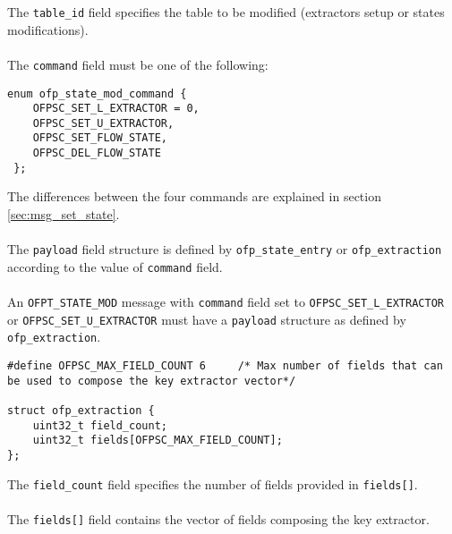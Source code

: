 \noindent
The \texttt{table\_id} field specifies the table to be modified (extractors setup or states modifications).
\\\\
The \texttt{command} field must be one of the following:
\scriptsize
\begin{verbatim}
enum ofp_state_mod_command {
    OFPSC_SET_L_EXTRACTOR = 0,
    OFPSC_SET_U_EXTRACTOR,
    OFPSC_SET_FLOW_STATE,   
    OFPSC_DEL_FLOW_STATE
 };
\end{verbatim}
\normalsize
The differences between the four commands are explained in section \ref{sec:msg_set_state}.
\\\\
The \texttt{payload} field structure is defined by \texttt{ofp\_state\_entry} or \texttt{ofp\_extraction} according to the value of \texttt{command} field.
\\\\
An \texttt{OFPT\_STATE\_MOD} message with \texttt{command} field set to \texttt{OFPSC\_SET\_L\_EXTRACTOR} or \texttt{OFPSC\_SET\_U\_EXTRACTOR} must have a \texttt{payload} structure as defined by \texttt{ofp\_extraction}.
\scriptsize
\begin{verbatim}
#define OFPSC_MAX_FIELD_COUNT 6     /* Max number of fields that can be used to compose the key extractor vector*/

struct ofp_extraction {
    uint32_t field_count;
    uint32_t fields[OFPSC_MAX_FIELD_COUNT];
};
\end{verbatim}
\normalsize
The \texttt{field\_count} field specifies the number of fields provided in \texttt{fields[]}.
\\\\The \texttt{fields[]} field contains the vector of fields composing the key extractor.

